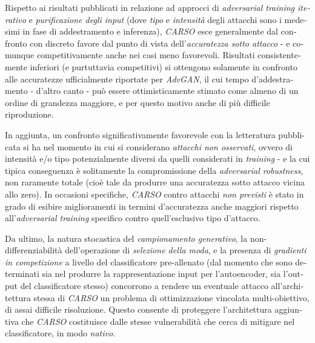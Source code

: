 \begin{otherlanguage}{italian}
Rispetto ai risultati pubblicati in relazione ad approcci di \textit{adversarial training iterativo} e \textit{purificazione degli input} (dove \textit{tipo} e \textit{intensità} degli attacchi sono i medesimi in fase di addestramento e inferenza), \textit{CARSO} esce generalmente dal confronto con discreto favore dal punto di vista dell'\textit{accuratezza sotto attacco} - e comunque competitivamente anche nei casi meno favorevoli. Risultati consistentemente inferiori (e purtuttavia competitivi) si ottengono solamente in confronto alle accuratezze ufficialmente riportate per \textit{AdvGAN}, il cui tempo d'addestramento - d'altro canto - può essere ottimisticamente stimato come almeno di un ordine di grandezza maggiore, e per questo motivo anche di più difficile riproduzione.

In aggiunta, un confronto significativamente favorevole con la letteratura pubblicata si ha nel momento in cui si considerano \textit{attacchi non osservati}, ovvero di intensità e/o tipo potenzialmente diversi da quelli considerati in \textit{training} - e la cui tipica conseguenza è solitamente la compromissione della \textit{adversarial robustness}, non raramente totale (cioè tale da produrre una accuratezza sotto attacco vicina allo zero). In occasioni specifiche, \textit{CARSO} contro attacchi \textit{non previsti} è stato in grado di esibire miglioramenti in termini d'accuratezza anche maggiori rispetto all'\textit{adversarial training} specifico contro quell'esclusivo tipo d'attacco.

Da ultimo, la natura stocastica del \textit{campionamento generativo}, la non-differenziabilità dell'operazione di \textit{selezione della moda}, e la presenza di \textit{gradienti in competizione} a livello del classificatore pre-allenato (dal momento che sono determinati sia nel produrre la rappresentazione input per l'autoencoder, sia l'output del classificatore stesso) concorrono a rendere un eventuale attacco all'architettura stessa di \textit{CARSO} un problema di ottimizzazione vincolata multi-obiettivo, di assai difficile risoluzione. Questo consente di proteggere l'architettura aggiuntiva che \textit{CARSO} costituisce dalle stesse vulnerabilità che cerca di mitigare nel classificatore, in modo \textit{nativo}.

\end{otherlanguage}